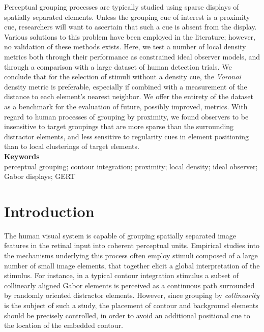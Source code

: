 \documentclass[12pt]{article}
\begin{document}
Perceptual grouping processes are typically studied using sparse displays of spatially separated elements. Unless the grouping cue of interest is a proximity cue, researchers will want to ascertain that such a cue is absent from the display. Various solutions to this problem have been employed in the literature; however, no validation of these methods exists. Here, we test a number of local density metrics both through their performance as constrained ideal observer models, and through a comparison with a large dataset of human detection trials. We conclude that for the selection of stimuli without a density cue, the \emph{Voronoi} density metric is preferable, especially if combined with a measurement of the distance to each element's nearest neighbor. We offer the entirety of the dataset as a benchmark for the evaluation of future, possibly improved, metrics. With regard to human processes of grouping by proximity, we found observers to be insensitive to target groupings that are more sparse than the surrounding distractor elements, and less sensitive to regularity cues in element positioning than to local clusterings of target elements. \\
[5em]
\textbf{Keywords}\\
perceptual grouping; contour integration; proximity; local density; ideal observer; Gabor displays; GERT

\newpage

\section{Introduction}\label{section_introduction}

The human visual system is capable of grouping spatially separated image features in the retinal input into coherent perceptual units. Empirical studies into the mechanisms underlying this process often employ stimuli composed of a large number of small image elements, that together elicit a global interpretation of the stimulus. For instance, in a typical contour integration stimulus \cite{Field93} a subset of collinearly aligned Gabor elements is perceived as a continuous path surrounded by randomly oriented distractor elements. However, since grouping by \emph{collinearity} is the subject of such a study, the placement of contour and background elements should be precisely controlled, in order to avoid an additional positional cue to the location of the embedded contour.\\
\end{document}
